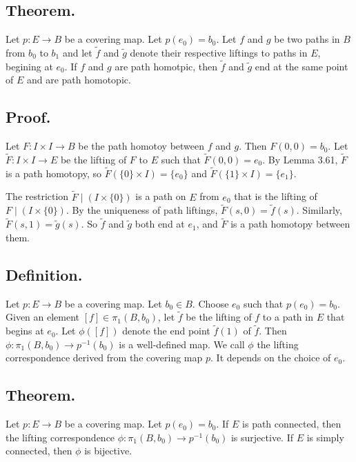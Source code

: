 \documentclass[titlepage]{article}
\begin{document}
\subsection{Theorem.} Let $p: E \to B$ be a covering map. Let $p(e_{0}) = b_{0}$. Let $f$ and $g$ be two paths in $B$ from $b_{0}$ to $b_{1}$ and let $\tilde{f}$ and $\tilde{g}$ denote their respective liftings to paths in $E$, begining at $e_{0}$. If $f$ and $g$ are path homotpic, then $\tilde{f}$ and $\tilde{g}$ end at the same point of $E$ and are path homotopic.

\subsection{Proof.} Let $F: I \times I \to B$ be the path homotoy between $f$ and $g$. Then $F(0, 0) = b_{0}$. Let $\tilde{F}: I \times I \to E$ be the lifting of $F$ to $E$ such that $\tilde{F}(0, 0) = e_{0}$. By Lemma 3.61, $\tilde{F}$ is a path homotopy, so $\tilde{F}(\{0\} \times I) = \{e_{0}\}$ and $\tilde{F}(\{1\} \times I) = \{e_{1}\}$.

The restriction $\tilde{F} \mid (I \times \{0\})$ is a path on $E$ from $e_{0}$ that is the lifting of $F \mid (I \times \{0\})$. By the uniqueness of path liftings, $\tilde{F}(s, 0) = \tilde{f}(s)$. Similarly, $\tilde{F}(s, 1) = \tilde{g}(s)$. So $\tilde{f}$ and $\tilde{g}$ both end at $e_{1}$, and $\tilde{F}$ is a path homotopy between them.

\subsection{Definition.} Let $p: E \to B$ be a covering map. Let $b_{0} \in B$. Choose $e_{0}$ such that $p(e_{0}) = b_{0}$. Given an element $[f] \in \pi_{1}(B, b_{0})$, let $\tilde{f}$ be the lifting of $f$ to a path in $E$ that begins at $e_{0}$. Let $\phi([f])$ denote the end point $\tilde{f}(1)$ of $\tilde{f}$. Then $\phi: \pi_{1}(B, b_{0}) \to p^{-1}(b_{0})$ is a well-defined map. We call $\phi$ the lifting correspondence derived from the covering map $p$. It depends on the choice of $e_{0}$.

\subsection{Theorem.} Let $p: E \to B$ be a covering map. Let $p(e_{0}) = b_{0}$. If $E$ is path connected, then the lifting correspondence $\phi: \pi_{1}(B, b_{0}) \to p^{-1}(b_{0})$ is surjective. If $E$ is simply connected, then $\phi$ is bijective.
\end{document}
